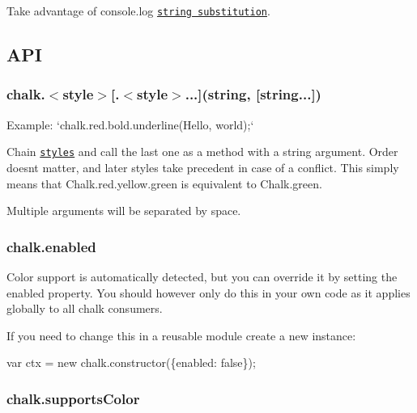 Take advantage of console.\+log \href{http://nodejs.org/docs/latest/api/console.html#console_console_log_data}{\tt string substitution}.




\subsection*{A\+P\+I}

\subsubsection*{chalk.{\ttfamily $<$style$>$\mbox{[}.$<$style$>$...\mbox{]}(string, \mbox{[}string...\mbox{]})}}

Example\+: `chalk.red.\+bold.\+underline(\textquotesingle{}Hello\textquotesingle{}, \textquotesingle{}world\textquotesingle{});`

Chain \href{#styles}{\tt styles} and call the last one as a method with a string argument. Order doesn\textquotesingle{}t matter, and later styles take precedent in case of a conflict. This simply means that {\ttfamily Chalk.\+red.\+yellow.\+green} is equivalent to {\ttfamily Chalk.\+green}.

Multiple arguments will be separated by space.

\subsubsection*{chalk.\+enabled}

Color support is automatically detected, but you can override it by setting the {\ttfamily enabled} property. You should however only do this in your own code as it applies globally to all chalk consumers.

If you need to change this in a reusable module create a new instance\+:


\begin{DoxyCode}
var ctx = \textcolor{keyword}{new} chalk.constructor(\{enabled: \textcolor{keyword}{false}\});
\end{DoxyCode}


\subsubsection*{chalk.\+supports\+Color}

